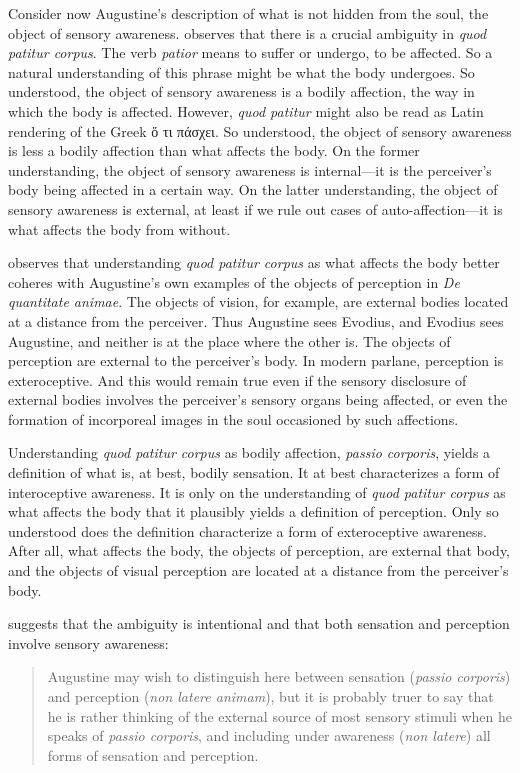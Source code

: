 \documentclass[12pt]{article}
\begin{document}
Consider now Augustine's description of what is not hidden from the soul, the object of sensory awareness. \citet[274--278]{Brittain:2002hl} observes that there is a crucial ambiguity in \emph{quod patitur corpus}. The verb \emph{patior} means to suffer or undergo, to be affected. So a natural understanding of this phrase might be what the body undergoes. So understood, the object of sensory awareness is a bodily affection, the way in which the body is affected. However, \emph{quod patitur} might also be read as Latin rendering of the Greek {\sbl ὅ τι πάσχει}. So understood, the object of sensory awareness is less a bodily affection than what affects the body. On the former understanding, the object of sensory awareness is internal---it is the perceiver's body being affected in a certain way. On the latter understanding, the object of sensory awareness is external, at least if we rule out cases of auto-affection---it is what affects the body from without. 

\citet[]{Brittain:2002hl} observes that understanding \emph{quod patitur corpus} as what affects the body better coheres with Augustine's own examples of the objects of perception in \emph{De quantitate animae}. The objects of vision, for example, are external bodies located at a distance from the perceiver. Thus Augustine sees Evodius, and Evodius sees Augustine, and neither is at the place where the other is. The objects of perception are external to the perceiver's body. In modern parlane, perception is exteroceptive. And this would remain true even if the sensory disclosure of external bodies involves the perceiver's sensory organs being affected, or even the formation of incorporeal images in the soul occasioned by such affections. 

Understanding \emph{quod patitur corpus} as bodily affection, \emph{passio corporis}, yields a definition of what is, at best, bodily sensation. It at best characterizes a form of interoceptive awareness. It is only on the understanding of \emph{quod patitur corpus} as what affects the body that it plausibly yields a definition of perception. Only so understood does the definition characterize a form of exteroceptive awareness. After all, what affects the body, the objects of perception, are external that body, and the objects of visual perception are located at a distance from the perceiver's body.

\citet[]{ODaly:1987fq} suggests that the ambiguity is intentional and that both sensation and perception involve sensory awareness:
\begin{quote}
	Augustine may wish to distinguish here between sensation (\emph{passio corporis}) and perception (\emph{non latere animam}), but it is probably truer to say that he is rather thinking of the external source of most sensory stimuli when he speaks of \emph{passio corporis}, and including under awareness (\emph{non latere}) all forms of sensation and perception.
\end{quote}
\end{document}
